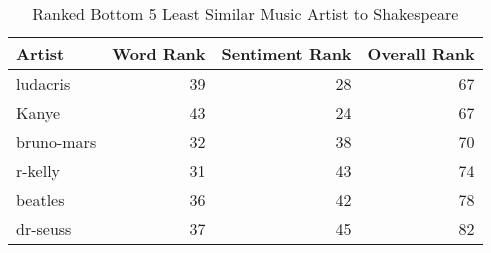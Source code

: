 \begin{table}[ht]
\centering
\begin{tabular}{lrrr}
  \hline
Artist & Word Rank & Sentiment Rank & Overall Rank \\ 
  \hline
ludacris &  39 &  28 &  67 \\ 
  Kanye &  43 &  24 &  67 \\ 
  bruno-mars &  32 &  38 &  70 \\ 
  r-kelly &  31 &  43 &  74 \\ 
  beatles &  36 &  42 &  78 \\ 
  dr-seuss &  37 &  45 &  82 \\ 
   \hline
\end{tabular}
\caption{Ranked Bottom 5 Least Similar Music Artist to Shakespeare} 
\label{tab:bottom5_ranktable}
\end{table}


